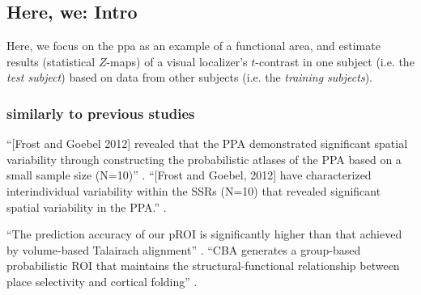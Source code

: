 \subsection{Here, we: Intro}


Here, we focus on the \ac{ppa} as an example of a functional area, and estimate
results (statistical $Z$-maps) of a visual localizer's $t$-contrast in one
subject (i.e. the \textit{test subject}) based on data from other subjects (i.e.
the \textit{training subjects}).


\subsubsection{similarly to previous studies}


%
``[Frost and Goebel 2012] revealed that the PPA demonstrated significant spatial
variability through constructing the probabilistic atlases of the PPA based on a
small sample size (N=10)'' \citep{zhen2017quantifying}.
%
``[Frost and Goebel, 2012] have characterized interindividual variability within
the SSRs (N=10) that revealed significant spatial variability in the PPA.''
\citep{zhen2017quantifying}.

``The prediction accuracy of our pROI is significantly higher than
that achieved by volume-based Talairach alignment'' \citep{weiner2018defining}.
%
``CBA generates a group-based probabilistic ROI that maintains the
structural-functional relationship between place selectivity and cortical
folding'' \citep{weiner2018defining}.

